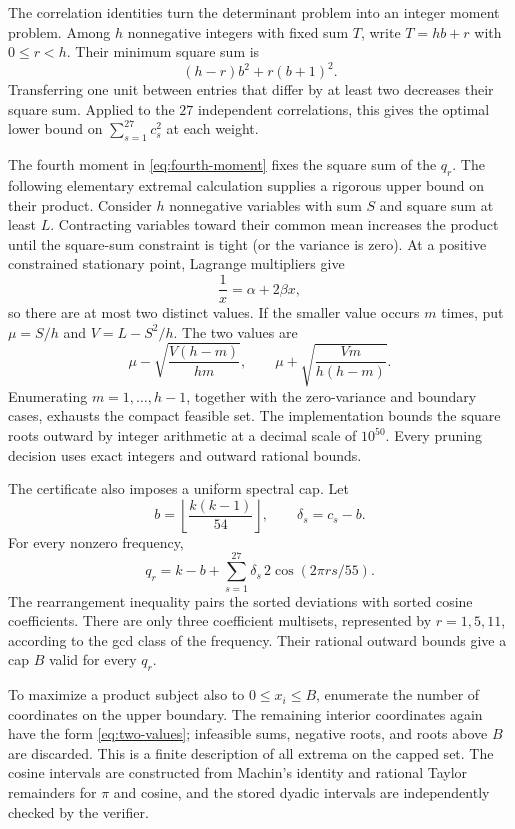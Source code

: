 \documentclass[11pt,a4paper]{article}
\theoremstyle{remark}
\begin{document}
The correlation identities turn the determinant problem into an
integer moment problem.  Among $h$ nonnegative integers with fixed sum
$T$, write $T=hb+r$ with $0\leq r<h$.  Their minimum square sum is
\[
  (h-r)b^2+r(b+1)^2.
\]
Transferring one unit between entries that differ by at least two
decreases their square sum.  Applied to the $27$ independent
correlations, this gives the optimal lower bound on
$\sum_{s=1}^{27}c_s^2$ at each weight.

The fourth moment in \eqref{eq:fourth-moment} fixes the square sum of the
$q_r$.  The following elementary extremal calculation supplies a rigorous
upper bound on their product.  Consider $h$ nonnegative variables with sum
$S$ and square sum at least $L$.  Contracting variables toward their common
mean increases the product until the square-sum constraint is tight (or the
variance is zero).  At a positive constrained stationary point, Lagrange
multipliers give
\[
  \frac1x=\alpha+2\beta x,
\]
so there are at most two distinct values.  If the smaller value occurs $m$
times, put $\mu=S/h$ and $V=L-S^2/h$.  The two values are
\begin{equation}
\label{eq:two-values}
  \mu-\sqrt{\frac{V(h-m)}{hm}},
  \qquad
  \mu+\sqrt{\frac{Vm}{h(h-m)}}.
\end{equation}
Enumerating $m=1,\ldots,h-1$, together with the zero-variance and boundary
cases, exhausts the compact feasible set.  The implementation bounds the
square roots outward by integer arithmetic at a decimal scale of $10^{50}$.
Every pruning decision uses exact integers and outward rational bounds.

The certificate also imposes a uniform spectral cap.  Let
\[
  b=\left\lfloor\frac{k(k-1)}{54}\right\rfloor,
  \qquad \delta_s=c_s-b.
\]
For every nonzero frequency,
\begin{equation}
\label{eq:spectral-cap-formula}
  q_r=k-b+\sum_{s=1}^{27}\delta_s\,2\cos(2\pi rs/55).
\end{equation}
The rearrangement inequality pairs the sorted deviations with sorted cosine
coefficients.  There are only three coefficient multisets, represented by
$r=1,5,11$, according to the gcd class of the frequency.  Their rational
outward bounds give a cap $B$ valid for every $q_r$.

To maximize a product subject also to $0\leq x_i\leq B$, enumerate the
number of coordinates on the upper boundary.  The remaining interior
coordinates again have the form \eqref{eq:two-values}; infeasible sums,
negative roots, and roots above $B$ are discarded.  This is a finite
description of all extrema on the capped set.  The cosine intervals are
constructed from Machin's identity and rational Taylor remainders for
$\pi$ and cosine, and the stored dyadic intervals are independently checked
by the verifier.
\end{document}
